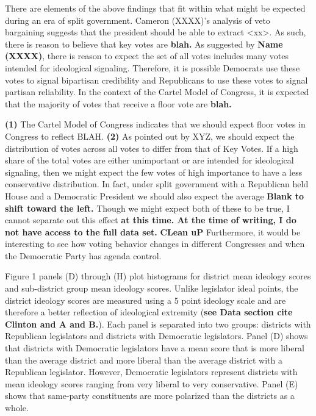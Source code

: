 \documentclass[10pt,letterpaper]{article}
\begin{document}
There are elements of the above findings that fit within what might be expected during an era of split government. Cameron (XXXX)'s analysis of veto bargaining suggests that the president should be able to extract <xx>. As such, there is reason to believe that key votes are \textbf{blah.} As suggested by \textbf{Name (XXXX)}, there is reason to expect the set of all votes includes many votes intended for ideological signaling. Therefore, it is possible Democrats use these votes to signal bipartisan credibility and Republicans to use these votes to signal partisan reliability. In the context of the Cartel Model of Congress, it is expected that the majority of votes that receive a floor vote are \textbf{blah.}


\textbf{(1)} The Cartel Model of Congress indicates that we should expect floor votes in Congress to reflect BLAH. \textbf{(2)} As pointed out by XYZ, we should expect the distribution of votes across all votes to differ from that of Key Votes. If a high share of the total votes are either unimportant or are intended for ideological signaling, then we might expect the few votes of high importance to have a less conservative distribution. In fact, under split government with a Republican held House and a Democratic President we should also expect the average \textbf{Blank to shift toward the left.} Though we might expect both of these to be true, I cannot separate out this effect \textbf{at this time. At the time of writing, I do not have access to the full data set.} \textbf{CLean uP} Furthermore, it would be interesting to see how voting behavior changes in different Congresses and when the Democratic Party has agenda control.

Figure 1 panels (D) through (H) plot histograms for district mean ideology scores and sub-district group mean ideology scores. Unlike legislator ideal points, the district ideology scores are measured using a 5 point ideology scale and are therefore a better reflection of ideological extremity (\textbf{see Data section cite Clinton and A and B.}). Each panel is separated into two groups: districts with Republican legislators and districts with Democratic legislators. Panel (D) shows that districts with Democratic legislators have a mean score that is more liberal than the average district and more liberal than the average district with a Republican legislator. However, Democratic legislators represent districts with mean ideology scores ranging from very liberal to very conservative. Panel (E) shows that same-party constituents are more polarized than the districts as a whole. 
\end{document}
